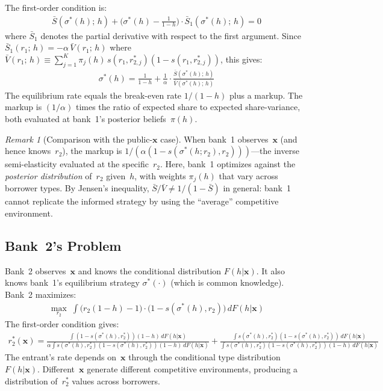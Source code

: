\documentclass[12pt]{article}
\theoremstyle{plain}
\theoremstyle{plain}
\theoremstyle{definition}
\theoremstyle{remark}
\newtheorem{remark}[thm]{Remark}
\begin{document}
The first-order condition is:
\begin{align}\label{eq:foc_b1_8}
    \bar{S}(\sigma^*(h);\, h) + \big(\sigma^*(h) - \tfrac{1}{1-h}\big) \cdot \bar{S}_1(\sigma^*(h);\, h) = 0
\end{align}
where $\bar{S}_1$ denotes the partial derivative with respect to the first argument.  Since $\bar{S}_1(r_1;\, h) = -\alpha\, \bar{V}(r_1;\, h)$ where $\bar{V}(r_1;\, h) \equiv \sum_{j=1}^K \pi_j(h)\, s(r_1, r_{2,j}^*)(1-s(r_1, r_{2,j}^*))$, this gives:
\begin{align}\label{eq:sigma8}
    \boxed{\sigma^*(h) = \frac{1}{1-h} + \frac{1}{\alpha} \cdot \frac{\bar{S}(\sigma^*(h);\, h)}{\bar{V}(\sigma^*(h);\, h)}}
\end{align}
The equilibrium rate equals the break-even rate $1/(1-h)$ plus a markup.  The markup is $(1/\alpha)$ times the ratio of expected share to expected share-variance, both evaluated at bank~1's posterior beliefs~$\pi(h)$.

\begin{remark}[Comparison with the public-$\mathbf{x}$ case]\label{rem:markup_comparison}
When bank~1 observes~$\mathbf{x}$ (and hence knows~$r_2$), the markup is $1/(\alpha(1-s(\sigma^*(h; r_2), r_2)))$---the inverse semi-elasticity evaluated at the specific~$r_2$.  Here, bank~1 optimizes against the \emph{posterior distribution} of~$r_2$ given~$h$, with weights $\pi_j(h)$ that vary across borrower types.  By Jensen's inequality, $\bar{S}/\bar{V} \neq 1/(1 - \bar{S})$ in general: bank~1 cannot replicate the informed strategy by using the ``average'' competitive environment.
\end{remark}


\subsection{Bank~2's Problem}

Bank~2 observes~$\mathbf{x}$ and knows the conditional distribution $F(h|\mathbf{x})$.  It also knows bank~1's equilibrium strategy $\sigma^*(\cdot)$ (which is common knowledge).  Bank~2 maximizes:
\begin{align}\label{eq:b2_problem8}
    \max_{r_2}\; \int \big(r_2(1-h) - 1\big) \cdot \big(1 - s(\sigma^*(h), r_2)\big)\, dF(h|\mathbf{x})
\end{align}
The first-order condition gives:
\begin{align}\label{eq:r2_8}
    \boxed{r_2^*(\mathbf{x}) = \frac{\int (1 - s(\sigma^*(h), r_2^*))(1-h)\, dF(h|\mathbf{x})}{\alpha \int s(\sigma^*(h), r_2^*)(1-s(\sigma^*(h), r_2^*))(1-h)\, dF(h|\mathbf{x})} + \frac{\int s(\sigma^*(h), r_2^*)(1-s(\sigma^*(h), r_2^*))\, dF(h|\mathbf{x})}{\int s(\sigma^*(h), r_2^*)(1-s(\sigma^*(h), r_2^*))(1-h)\, dF(h|\mathbf{x})}}
\end{align}
The entrant's rate depends on~$\mathbf{x}$ through the conditional type distribution $F(h|\mathbf{x})$.  Different~$\mathbf{x}$ generate different competitive environments, producing a distribution of~$r_2^*$ values across borrowers.
\end{document}
